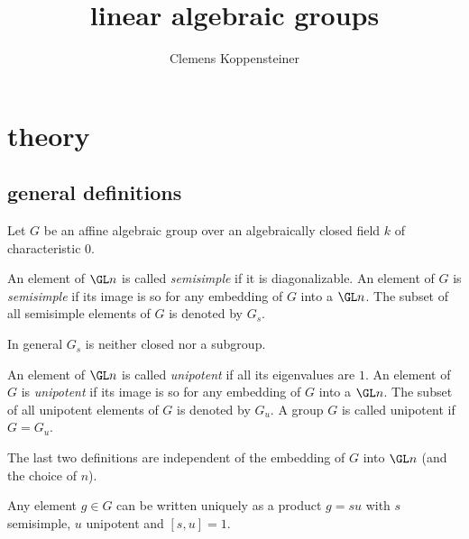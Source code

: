 \documentclass[english, no-theorem-numbers]{short-notes}
\title{linear algebraic groups}
\author{Clemens Koppensteiner}
\begin{document}
\maketitle

\section*{theory}

\subsection*{general definitions}

Let $G$ be an affine algebraic group over an algebraically closed field $k$ of characteristic $0$.

%
%

\begin{Def}
    An element of $\GL n$ is called \emph{semisimple} if it is diagonalizable.
    An element of $G$ is \emph{semisimple} if its image is so for any embedding of $G$ into a $\GL n$.
    The subset of all semisimple elements of $G$ is denoted by $G_s$.
\end{Def}

In general $G_s$ is neither closed nor a subgroup.

\begin{Def}
    An element of $\GL n$ is called \emph{unipotent} if all its eigenvalues are $1$.
    An element of $G$ is \emph{unipotent} if its image is so for any embedding of $G$ into a $\GL n$.
    The subset of all unipotent elements of $G$ is denoted by $G_u$.
    A group $G$ is called unipotent if $G = G_u$.
\end{Def}

The last two definitions are independent of the embedding of $G$ into $\GL n$ (and the choice of $n$).

\begin{Thm}
    Any element $g∈G$ can be written uniquely as a product $g=su$ with $s$ semisimple, $u$ unipotent and $[s,u] = 1$.
\end{Thm}
\end{document}
